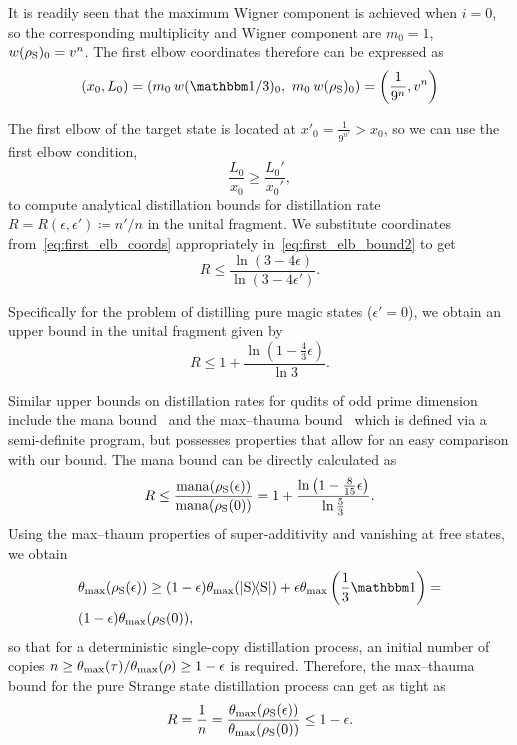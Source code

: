 \documentclass[pra,
aps,
twocolumn,
superscriptaddress,
groupedaddress,
nofootinbib,
reprint
]{revtex4-1}
\begin{document}
It is readily seen that the maximum Wigner component is achieved when $i=0$, so the corresponding multiplicity and Wigner component are $m_0 = 1$, $w(\rho_{\rm{S}})_0 = v^n$.
The first elbow coordinates therefore can be expressed as
\begin{equation}\label{eq:first_elb_coords}
	(x_0, L_0) = (m_0\hspace{2pt} w(\id/3)_0,\ m_0\hspace{2pt} w(\rho_{\rm{S}})_0) = \left(\frac{1}{9^n}, v^n \right)
\end{equation}

The first elbow of the target state is located at $x'_0 = \frac{1}{9^{n'}} > x_0$, so we can use the first elbow condition,
\begin{equation}\label{eq:first_elb_bound2}
	\frac{L_0}{x_0} \geq \frac{L_0'}{x_0'},
\end{equation}
to compute analytical distillation bounds for distillation rate $R = R(\epsilon, \epsilon') \coloneqq n'/n$ in the unital fragment.
We substitute coordinates from~\cref{eq:first_elb_coords} appropriately in~\cref{eq:first_elb_bound2} to get
\begin{equation}
	R \leq \frac{\ln{(3-4\epsilon)}}{\ln{(3-4\epsilon')}}.
\end{equation}

Specifically for the problem of distilling pure magic states ($\epsilon'=0$), we obtain an upper bound in the unital fragment given by
\begin{equation}
	R \leq 1 + \frac{\ln (1 - \frac{4}{3} \epsilon)}{\ln 3}.
\end{equation}

Similar upper bounds on distillation rates for qudits of odd prime dimension include the mana bound~\cite{cit:veitch} and the max--thauma bound~\cite{Wang_2020} which is defined via a semi-definite program, but possesses properties that allow for an easy comparison with our bound.
The mana bound can be directly calculated as
\begin{equation}
	R \leq \frac{{{\rm{mana}}(\rho_{\rm{S}}(\epsilon))}}{{{\rm{mana}}(\rho_{\rm{S}}(0))}} = 1 + \frac{\ln \left(1 - \frac{8}{15}\epsilon \right)}{\ln \frac{5}{3}}.
\end{equation}
Using the max--thaum properties of super-additivity and vanishing at free states, we obtain
\begin{align}
	&\theta_{\rm{max}}(\rho_{\rm{S}}(\epsilon)) \geq (1-\epsilon) \theta_{\rm{max}}(\ketbra{\rm{S}}) + \epsilon \theta_{\rm{max}}\left(\frac{1}{3}\id \right) = \nonumber\\
	&(1-\epsilon) \theta_{\rm{max}}(\rho_{\rm{S}}(0)),
\end{align}
so that for a deterministic single-copy distillation process, an initial number of copies $n \geq \theta_{\rm{max}}(\tau) / \theta_{\rm{max}}(\rho) \geq 1-\epsilon$ is required.
Therefore, the max--thauma bound for the pure Strange state distillation process can get as tight as
\begin{equation}
	R = \frac{1}{n} = \frac{\theta_{\rm{max}}(\rho_{\rm{S}}(\epsilon))}{\theta_{\rm{max}}(\rho_{\rm{S}}(0))} \leq 1-\epsilon.
\end{equation}
\end{document}
